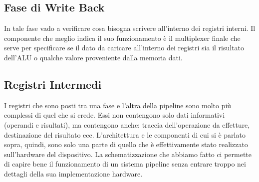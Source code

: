 \subsection{Fase di Write Back}
In tale fase vado a verificare cosa bisogna scrivere all'interno dei registri interni. Il componente che meglio indica il suo funzionamento è il multiplexer finale che serve per specificare se il dato da caricare all'interno dei registri sia il risultato dell'ALU o qualche valore proveniente dalla memoria dati. 

\subsection{Registri Intermedi}
I registri che sono posti tra una fase e l'altra della pipeline sono molto più complessi di quel che si crede. Essi non contengono solo dati informativi (operandi e risultati), ma contengono anche: traccia dell'operazione da effetture, destinazione del risultato ecc. 
L'architettura e le componenti di cui si è parlato sopra, quindi, sono solo una parte di quello che è effettivamente stato realizzato sull'hardware del dispositivo.
La schematizzazione che abbiamo fatto ci permette di capire bene il funzionamento di un sistema pipeline senza entrare troppo nei dettagli della sua implementazione hardware.


